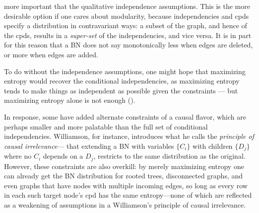 \documentclass{article}
\begin{document}
	            more important that the qualitative independence assumptions.  
    	This is the more desirable option if one cares about
    	modularity, because independencies and cpds specify a distribution in
		contravariant ways: a subset of
    	the graph, and hence of the cpds, results in a \emph{super-set} of
    	the independencies, and vice versa. It is in part for this reason
    	that a BN does not say monotonically less when edges are deleted, or
    	more when edges are added. 
	   
	

	    To do without the independence assumptions, one might hope
	            that maximizing entropy would recover the conditional
	            independencies, as maximizing entropy tends to make things as
	            independent as possible given the constraints --- but
	            maximizing entropy alone is not enough
	            ().

	    	In response, some \cite{williamson2001foundations}\cite{holmes2001independence} have added alternate constraints of a causal flavor, which are perhaps smaller and more palatable than the full set of conditional independencies.  Williamson, for instance, introduces what he calls the \emph{principle of causal irrelevance}--- that extending a BN with variables $\{C_i\}$ with children $\{D_j\}$ where no $C_i$ depends on a $D_j$, restricts to the same distribution as the original.  However, these constraints are also overkill: by merely maximizing entropy one can already get the BN distribution for rooted trees, disconnected graphs, and even graphs that have nodes with multiple incoming edges, so long as every row in each such target node's cpd has the same entropy---none of which are reflected as a weakening of assumptions in a Williamson's principle of causal irrelevance.
	    	
\end{document}
